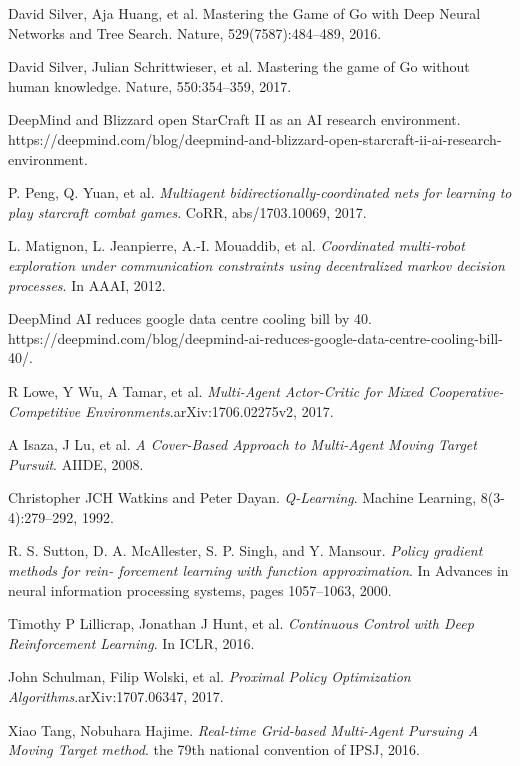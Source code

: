 \documentclass[11pt,twocolumn]{jarticle} %
\begin{document}
\begin{thebibliography}{9}

David Silver, Aja Huang, et al. Mastering the Game of Go with Deep Neural Networks and Tree Search. Nature, 529(7587):484–489, 2016.

David Silver, Julian Schrittwieser, et al. Mastering the game of Go without human knowledge. Nature, 550:354–359, 2017.

DeepMind and Blizzard open StarCraft II as an AI research environment. https://deepmind.com/blog/deepmind-and-blizzard-open-starcraft-ii-ai-research-environment.

 P. Peng, Q. Yuan, et al. \textsl{Multiagent bidirectionally-coordinated nets for learning to play starcraft combat games}. CoRR, abs/1703.10069, 2017.

L. Matignon, L. Jeanpierre, A.-I. Mouaddib, et al. \textsl{Coordinated multi-robot exploration under
communication constraints using decentralized markov decision processes}. In AAAI, 2012.

DeepMind AI reduces google data centre cooling bill by 40. https://deepmind.com/blog/deepmind-ai-reduces-google-data-centre-cooling-bill-40/.

R Lowe, Y Wu, A Tamar, et al. \textsl{Multi-Agent Actor-Critic for Mixed Cooperative-Competitive Environments}.arXiv:1706.02275v2, 2017.

A Isaza, J Lu, et al. \textsl{A Cover-Based Approach to Multi-Agent Moving Target Pursuit}. AIIDE, 2008.

Christopher JCH Watkins and Peter Dayan. \textsl{Q-Learning}. Machine Learning, 8(3-4):279–292, 1992.

R. S. Sutton, D. A. McAllester, S. P. Singh, and Y. Mansour. \textsl{Policy gradient methods for rein-
forcement learning with function approximation}. In Advances in neural information processing systems, pages 1057–1063, 2000.

Timothy P Lillicrap, Jonathan J Hunt, et al. \textsl{Continuous Control with Deep Reinforcement Learning}. In ICLR, 2016.

John Schulman, Filip Wolski, et al. \textsl{Proximal Policy Optimization Algorithms}.arXiv:1707.06347, 2017.

Xiao Tang, Nobuhara Hajime. \textsl{Real-time Grid-based Multi-Agent Pursuing A Moving Target method}. the 79th national convention of IPSJ, 2016. 


\end{thebibliography}
\end{document}
